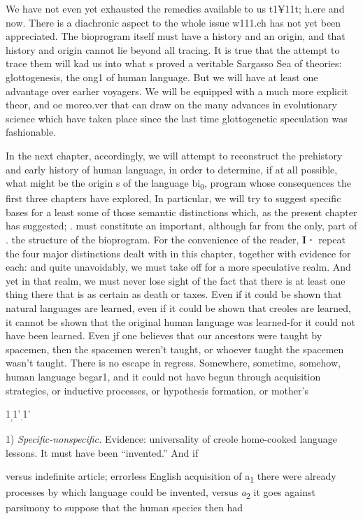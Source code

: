 We have not even yet exhausted the remedies available to us t1¥11t; h.ere and now. There is a diachronic aspect to the whole issue w111.ch has not yet been appreciated. The bioprogram itself must have a history and an origin, and that history and origin cannot lie beyond all tracing. It is true that the attempt to trace them will kad us into what s proved a veritable Sargasso Sea of theories: glottogenesis, the ong1 of human language. But we will have at least one advantage over earher voyagers. We will be equipped with a much more explicit theor, and oe moreo.ver that can draw on the many advances in
evolutionary science which have taken place since the last time glotto\-genetic speculation was fashionable.


In the next chapter, accordingly, we will attempt to reconstruct the prehistory and early history of human language, in order to deter\-mine, if at all possible, what might be the origin s of the language bi\textsubscript{0}, program whose consequences the first three chapters have explored, In particular, we will try to suggest specific bases for a least some of those semantic distinctions which, as the present chapter has suggested; . must constitute an important, although far from the only, part of . the structure of the bioprogram. For the convenience of the reader, \textbf{I·} repeat the four major distinctions dealt with in this chapter, together with evidence for each: 
and quite unavoidably, we must take off for a more speculative realm. And yet in that realm, we must never lose sight of the fact that there is at least one thing there that is as certain as death or taxes. Even if it could be shown that natural languages are learned, even if it could
be shown that creoles are learned, it cannot be shown that the original human language was learned-for it could not have been learned. Even jf one believes that our ancestors were taught by spacemen, then the spacemen weren't taught, or whoever taught the spacemen wasn't taught. There is no escape in regress. Somewhere, sometime, somehow, human language begar1, and it could not have begun through acquisition strategies, or inductive processes, or hypothesis formation, or mother's

1\textsubscript{,}1'\textsubscript{.}1'

1) \textit{Specific-nonspecific. }Evidence: universality of creole home-cooked language lessons. It must have been ``invented.'' And if

versus indefinite article; errorless English acquisition of a\textsubscript{1} there were already processes by which language could be invented, versus \textit{a}\textsubscript{2} it goes against parsimony to suppose that the human species then had

